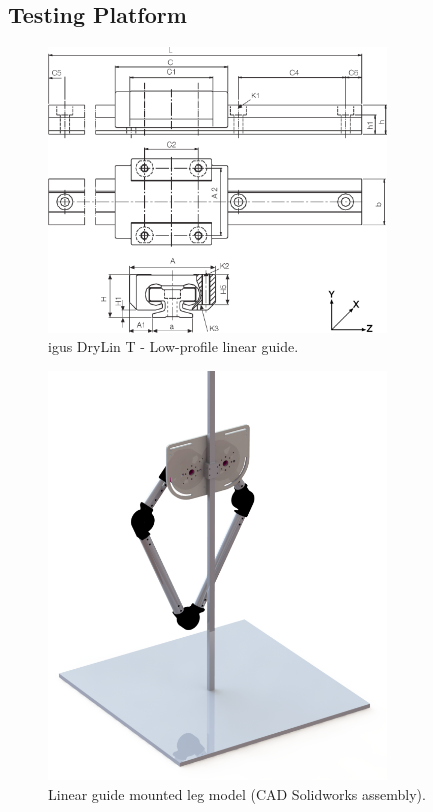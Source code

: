 \subsection{Testing Platform}


\begin{figure}
\centering
\includegraphics[width=0.8\textwidth]{images/mechanical/drylin-linear-guide.png} 
\caption{igus DryLin T - Low-profile linear guide.}
\label{fig:drylin-linear-guide}
\end{figure}


\begin{figure}
\centering
\includegraphics[width=0.8\textwidth]{images/mechanical/back-shot.png} 
\caption{Linear guide mounted leg model (CAD Solidworks assembly).}
\label{fig:Linear guide mounted leg model}
\end{figure}


